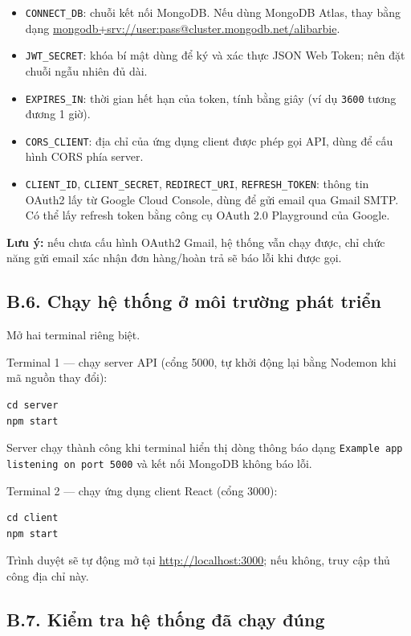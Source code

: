 \documentclass[../DoAn.tex]{subfiles}
\begin{document}
\begin{itemize}
  \item \texttt{CONNECT\_DB}: chuỗi kết nối MongoDB. Nếu dùng MongoDB Atlas,
        thay bằng dạng \url{mongodb+srv://user:pass@cluster.mongodb.net/alibarbie}.
  \item \texttt{JWT\_SECRET}: khóa bí mật dùng để ký và xác thực JSON Web
        Token; nên đặt chuỗi ngẫu nhiên đủ dài.
  \item \texttt{EXPIRES\_IN}: thời gian hết hạn của token, tính bằng giây
        (ví dụ \texttt{3600} tương đương 1 giờ).
  \item \texttt{CORS\_CLIENT}: địa chỉ của ứng dụng client được phép gọi
        API, dùng để cấu hình CORS phía server.
  \item \texttt{CLIENT\_ID}, \texttt{CLIENT\_SECRET}, \texttt{REDIRECT\_URI},
        \texttt{REFRESH\_TOKEN}: thông tin OAuth2 lấy từ Google Cloud
        Console, dùng để gửi email qua Gmail SMTP. Có thể lấy refresh token
        bằng công cụ OAuth 2.0 Playground của Google.
\end{itemize}

\textbf{Lưu ý:} nếu chưa cấu hình OAuth2 Gmail, hệ thống vẫn chạy được, chỉ
chức năng gửi email xác nhận đơn hàng/hoàn trả sẽ báo lỗi khi được gọi.

\subsection*{B.6. Chạy hệ thống ở môi trường phát triển}

Mở hai terminal riêng biệt.

Terminal 1 --- chạy server API (cổng 5000, tự khởi động lại bằng Nodemon
khi mã nguồn thay đổi):
\begin{verbatim}
cd server
npm start
\end{verbatim}

Server chạy thành công khi terminal hiển thị dòng thông báo dạng
\texttt{Example app listening on port 5000} và kết nối MongoDB không báo lỗi.

Terminal 2 --- chạy ứng dụng client React (cổng 3000):
\begin{verbatim}
cd client
npm start
\end{verbatim}

Trình duyệt sẽ tự động mở tại \url{http://localhost:3000}; nếu không, truy
cập thủ công địa chỉ này.

\subsection*{B.7. Kiểm tra hệ thống đã chạy đúng}
\end{document}

